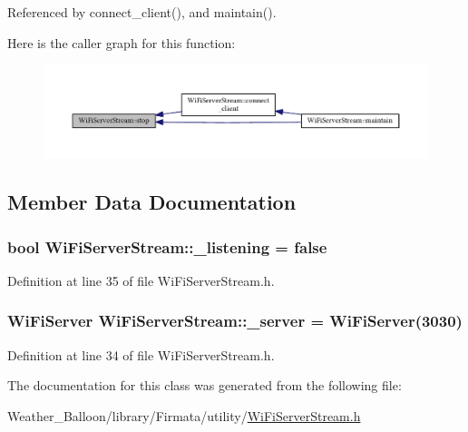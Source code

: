 Referenced by connect\+\_\+client(), and maintain().



Here is the caller graph for this function\+:\nopagebreak
\begin{figure}[H]
\begin{center}
\leavevmode
\includegraphics[width=350pt]{class_wi_fi_server_stream_a5c70b0545e4150f64ddfe26aeb48a436_icgraph}
\end{center}
\end{figure}




\subsection{Member Data Documentation}
\subsubsection[{\texorpdfstring{\+\_\+listening}{\_listening}}]{\setlength{\rightskip}{0pt plus 5cm}bool Wi\+Fi\+Server\+Stream\+::\+\_\+listening = false\hspace{0.3cm}{\ttfamily [protected]}}\hypertarget{class_wi_fi_server_stream_a932e0b7ba6cf5dbb293abe159a0e5637}{}\label{class_wi_fi_server_stream_a932e0b7ba6cf5dbb293abe159a0e5637}


Definition at line 35 of file Wi\+Fi\+Server\+Stream.\+h.

\subsubsection[{\texorpdfstring{\+\_\+server}{\_server}}]{\setlength{\rightskip}{0pt plus 5cm}Wi\+Fi\+Server Wi\+Fi\+Server\+Stream\+::\+\_\+server = Wi\+Fi\+Server(3030)\hspace{0.3cm}{\ttfamily [protected]}}\hypertarget{class_wi_fi_server_stream_a8071c6080d96ff5237bfd82ea4b7527b}{}\label{class_wi_fi_server_stream_a8071c6080d96ff5237bfd82ea4b7527b}


Definition at line 34 of file Wi\+Fi\+Server\+Stream.\+h.



The documentation for this class was generated from the following file\+:\begin{DoxyCompactItemize}
\item 
Weather\+\_\+\+Balloon/library/\+Firmata/utility/\hyperlink{_wi_fi_server_stream_8h}{Wi\+Fi\+Server\+Stream.\+h}\end{DoxyCompactItemize}
